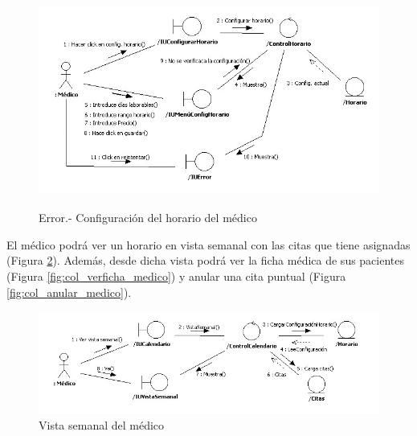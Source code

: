 		\begin{figure}[H]
		  \centering
		    \includegraphics[width=16cm, height=7cm]{img/jpg/colaboraciones/7_ConfiguracionHorarioMedicoError.jpg}
		  \caption{Error.- Configuración del horario del médico}
		  \label{fig:col_config_horario_medico_err}
		\end{figure}
		
		El médico podrá ver un horario en vista semanal con las citas que tiene asignadas (Figura \ref{fig:col_vistasemanal_medico}). Además, desde dicha vista podrá ver la ficha médica de sus pacientes (Figura \ref{fig:col_verficha_medico}) y anular una cita puntual (Figura \ref{fig:col_anular_medico}).
		
		\begin{figure}[H]
		  \centering
		    \includegraphics[width=16cm]{img/jpg/colaboraciones/8_VistaSemanalMedico.jpg}
		  \caption{Vista semanal del médico}
		  \label{fig:col_vistasemanal_medico}
		\end{figure}
		
